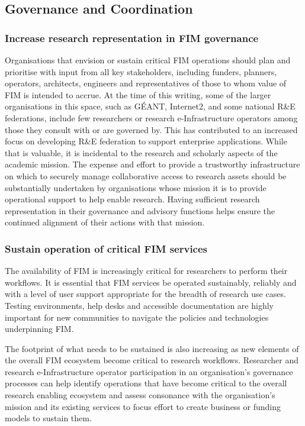 \documentclass[fleqn,10pt]{wlscirep}
\begin{document}
{\subsection{Governance and Coordination}
\subsubsection{Increase research representation in FIM governance}
Organisations that envision or sustain critical FIM operations should plan and prioritise with input from all key stakeholders, including funders, planners, operators, architects, engineers and representatives of those to whom value of FIM is intended to accrue. At the time of this writing, some of the larger organisations in this space, such as GÉANT, Internet2, and some national R\&E federations, include few researchers or research e-Infrastructure operators among those they consult with or are governed by. This has contributed to an increased focus on developing R\&E federation to support enterprise applications. While that is valuable, it is incidental to the research and scholarly aspects of the academic mission. The expense and effort to provide a trustworthy infrastructure on which to securely manage collaborative access to research assets should be substantially undertaken by organisations whose mission it is to provide operational support to help enable research. Having sufficient research representation in their governance and advisory functions helps ensure the continued alignment of their actions with that mission.
\subsubsection{Sustain operation of critical FIM services}
The availability of FIM is increasingly critical for researchers to perform their workflows. It is essential that FIM services be operated sustainably, reliably and with a level of user support appropriate for the breadth of research use cases. Testing environments, help desks and accessible documentation are highly important for new communities to navigate the policies and technologies underpinning FIM. 

The footprint of what needs to be sustained is also increasing as new elements of the overall FIM ecosystem become critical to research workflows. Researcher and research e-Infrastructure operator participation in an organisation’s governance processes can help identify operations that have become critical to the overall research enabling ecosystem and assess consonance with the organisation’s mission and its existing services to focus effort to create business or funding models to sustain them. 

}
\end{document}
